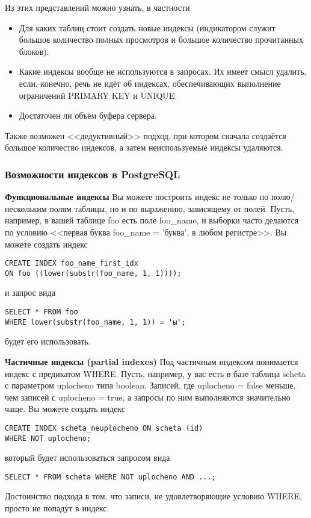 Из этих представлений можно узнать, в частности
\begin{itemize}
 \item Для каких таблиц стоит создать новые индексы (индикатором служит большое количество полных просмотров и большое количество 
прочитанных блоков).
 \item Какие индексы вообще не используются в запросах. Их имеет смысл удалить, если, конечно, речь не идёт об индексах, 
обеспечивающих выполнение ограничений PRIMARY KEY и UNIQUE.
 \item Достаточен ли объём буфера сервера.
\end{itemize}

Также возможен <<дедуктивный>> подход, при котором сначала создаётся большое количество индексов, а затем неиспользуемые индексы удаляются.

\subsubsection{Возможности индексов в PostgreSQL}
\textbf{Функциональные индексы} Вы можете построить индекс не только по полю/нескольким полям таблицы, но и по выражению, зависящему от полей.
Пусть, например, в вашей таблице foo есть поле foo\_name, и выборки часто делаются по условию 
<<первая буква foo\_name = 'буква', в любом регистре>>.
Вы можете создать индекс
\begin{verbatim}
CREATE INDEX foo_name_first_idx 
ON foo ((lower(substr(foo_name, 1, 1))));
\end{verbatim}
и запрос вида
\begin{verbatim}
SELECT * FROM foo 
WHERE lower(substr(foo_name, 1, 1)) = 'ы';
\end{verbatim}
будет его использовать.

\textbf{Частичные индексы (partial indexes)} Под частичным индексом понимается индекс с предикатом WHERE. Пусть, например, 
у вас есть в базе таблица scheta с параметром uplocheno типа boolean. Записей, где uplocheno = false меньше, чем записей 
с uplocheno = true, а запросы по ним выполняются значительно чаще. Вы можете создать индекс
\begin{verbatim}
CREATE INDEX scheta_neuplocheno ON scheta (id)
WHERE NOT uplocheno;
\end{verbatim}
который будет использоваться запросом вида
\begin{verbatim}
SELECT * FROM scheta WHERE NOT uplocheno AND ...;
\end{verbatim}
Достоинство подхода в том, что записи, не удовлетворяющие условию WHERE,
просто не попадут в индекс.


